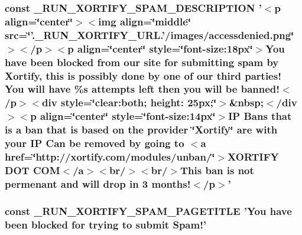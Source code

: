 \hypertarget{constants_8php_ade85f11916906db345935caa6bfc5e70}{
\subsubsection[{\-\_\-\-R\-U\-N\-\_\-\-X\-O\-R\-T\-I\-F\-Y\-\_\-\-S\-P\-A\-M\-\_\-\-D\-E\-S\-C\-R\-I\-P\-T\-I\-O\-N}]{\setlength{\rightskip}{0pt plus 5cm}const \-\_\-\-R\-U\-N\-\_\-\-X\-O\-R\-T\-I\-F\-Y\-\_\-\-S\-P\-A\-M\-\_\-\-D\-E\-S\-C\-R\-I\-P\-T\-I\-O\-N '$<$p align=\char`\"{}center\char`\"{}$>$$<$img align=\char`\"{}middle\char`\"{} src=\char`\"{}'.\-\_\-\-R\-U\-N\-\_\-\-X\-O\-R\-T\-I\-F\-Y\-\_\-\-U\-R\-L.'/images/accessdenied.\-png\char`\"{}$>$$<$/p$>$$<$p align=\char`\"{}center\char`\"{} style=\char`\"{}font-\/size\-:18px\char`\"{}$>$You have been blocked from our site for submitting spam by Xortify, this is possibly done by one of our third parties! You will have \%s attempts left then you will be banned!$<$/p$>$$<$div style=\char`\"{}clear\-:both; height\-: 25px;\char`\"{}$>$\&nbsp;$<$/div$>$$<$p align=\char`\"{}center\char`\"{} style=\char`\"{}font-\/size\-:14px\char`\"{}$>$\-I\-P Bans that is a ban that is based on the provider \char`\"{}\-Xortify\char`\"{} are with your I\-P Can be removed by going to $<$a href=\char`\"{}http\-://xortify.\-com/modules/unban/\char`\"{}$>$\-X\-O\-R\-T\-I\-F\-Y D\-O\-T C\-O\-M$<$/a$>$$<$br/$>$$<$br/$>$\-This ban is not permenant and will drop in 3 months!$<$/p$>$'}}\label{constants_8php_ade85f11916906db345935caa6bfc5e70}
\hypertarget{constants_8php_aac15bb1f0d2c1c197625f079781d7a3f}{
\subsubsection[{\-\_\-\-R\-U\-N\-\_\-\-X\-O\-R\-T\-I\-F\-Y\-\_\-\-S\-P\-A\-M\-\_\-\-P\-A\-G\-E\-T\-I\-T\-L\-E}]{\setlength{\rightskip}{0pt plus 5cm}const \-\_\-\-R\-U\-N\-\_\-\-X\-O\-R\-T\-I\-F\-Y\-\_\-\-S\-P\-A\-M\-\_\-\-P\-A\-G\-E\-T\-I\-T\-L\-E 'You have been blocked for trying to submit Spam!'}}\label{constants_8php_aac15bb1f0d2c1c197625f079781d7a3f}

